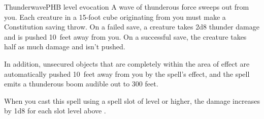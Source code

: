 \begin{spell}{Thunderwave}{PHB}{ level evocation}
{
}
A wave of thunderous force sweeps out from you. Each
creature in a 15-foot cube originating from you must
make a Constitution saving throw. On a failed save, a
creature takes 2d8 thunder damage and is pushed 10~feet
away from you. On a successful save, the creature
takes half as much damage and isn't pushed.

In addition, unsecured objects that are completely
within the area of effect are automatically pushed 10~feet
away from you by the spell's effect, and the spell emits a
thunderous boom audible out to 300 feet.

 When you cast this spell using a
spell slot of  level or higher, the damage increases by
1d8 for each slot level above .
\end{spell}